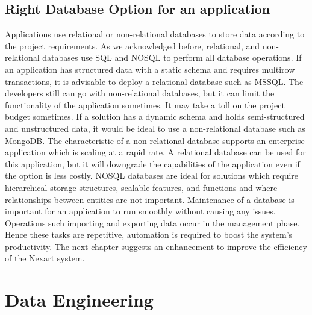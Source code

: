 \documentclass[a4Paper,12pt]{report}
\begin{document}
\section{Right Database Option for an application}
Applications use relational or non-relational databases to store data according to the project requirements. As we acknowledged before, relational, and non-relational databases use SQL and NOSQL to perform all database operations. If an application has structured data with a static schema and requires multirow transactions, it is advisable to deploy a relational database such as MSSQL. The developers still can go with non-relational databases, but it can limit the functionality of the application sometimes. It may take a toll on the project budget sometimes. If a solution has a dynamic schema and holds semi-structured and unstructured data, it would be ideal to use a non-relational database such as MongoDB. The characteristic of a non-relational database supports an enterprise application which is scaling at a rapid rate. A relational database can be used for this application, but it will downgrade the capabilities of the application even if the option is less costly. NOSQL databases are ideal for solutions which require hierarchical storage structures, scalable features, and functions and where relationships between entities are not important. Maintenance of a database is important for an application to run smoothly without causing any issues. Operations such importing and exporting data occur in the management phase. Hence these tasks are repetitive, automation is required to boost the system's productivity. The next chapter suggests an enhancement to improve the efficiency of the Nexart system.
\chapter{Data Engineering}
\end{document}
